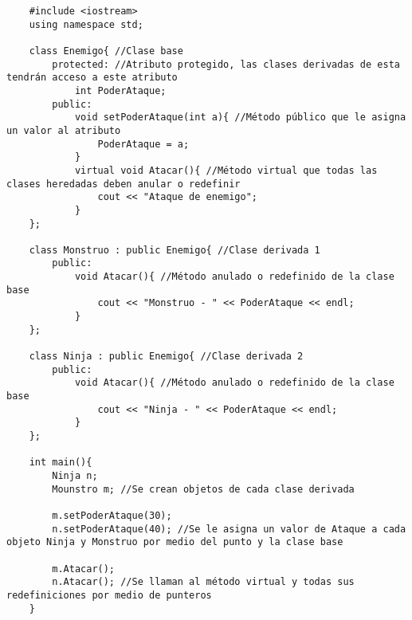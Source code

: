 \begin{lstlisting}
    #include <iostream>
    using namespace std;
    
    class Enemigo{ //Clase base
        protected: //Atributo protegido, las clases derivadas de esta tendrán acceso a este atributo
            int PoderAtaque;
        public:
            void setPoderAtaque(int a){ //Método público que le asigna un valor al atributo
                PoderAtaque = a;
            }
            virtual void Atacar(){ //Método virtual que todas las clases heredadas deben anular o redefinir
                cout << "Ataque de enemigo";
            }
    };
    
    class Monstruo : public Enemigo{ //Clase derivada 1
        public:
            void Atacar(){ //Método anulado o redefinido de la clase base
                cout << "Monstruo - " << PoderAtaque << endl;
            }
    };
    
    class Ninja : public Enemigo{ //Clase derivada 2
        public:
            void Atacar(){ //Método anulado o redefinido de la clase base
                cout << "Ninja - " << PoderAtaque << endl;
            }
    };
    
    int main(){
        Ninja n;
        Mounstro m; //Se crean objetos de cada clase derivada
        
        m.setPoderAtaque(30);
        n.setPoderAtaque(40); //Se le asigna un valor de Ataque a cada objeto Ninja y Monstruo por medio del punto y la clase base
        
        m.Atacar();
        n.Atacar(); //Se llaman al método virtual y todas sus redefiniciones por medio de punteros
    }
\end{lstlisting}
